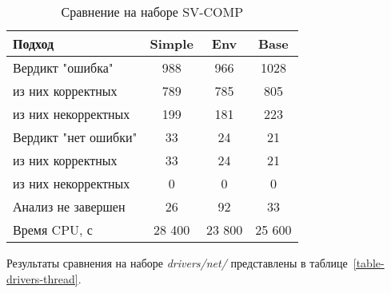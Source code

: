   \begin{table}[h]\footnotesize \centering
    \caption{Сравнение на наборе SV-COMP}
  	\label{table-svcomp-thread}
    \begin{tabular}{ | l | c | c | c | }
      \hline
      Подход         				& Simple   	& Env 		& Base  	\\ \hline
      Вердикт "ошибка" 				& 988    	& 966       & 1028       \\ 
  \hspace{0.5cm} из них корректных 	& 789 		& 785 		& 805    	\\ 
  \hspace{0.5cm} из них некорректных & 199 		& 181 		& 223     	\\ \hline
      Вердикт "нет ошибки"  		& 33      	& 24        & 21       	\\ 
  \hspace{0.5cm} из них корректных 	& 33 		& 24    	& 21      	\\
  \hspace{0.5cm} из них некорректных & 0 		& 0    		& 0     	\\ \hline
      Анализ не завершен       		& 26     	& 92        & 33    	\\ \hline
      Время CPU, с   				& 28 400 	& 23 800    & 25 600  	\\
      \hline
    \end{tabular}
  \end{table}



Результаты сравнения на наборе \textit{drivers/net/} представлены в таблице~\ref{table-drivers-thread}.

